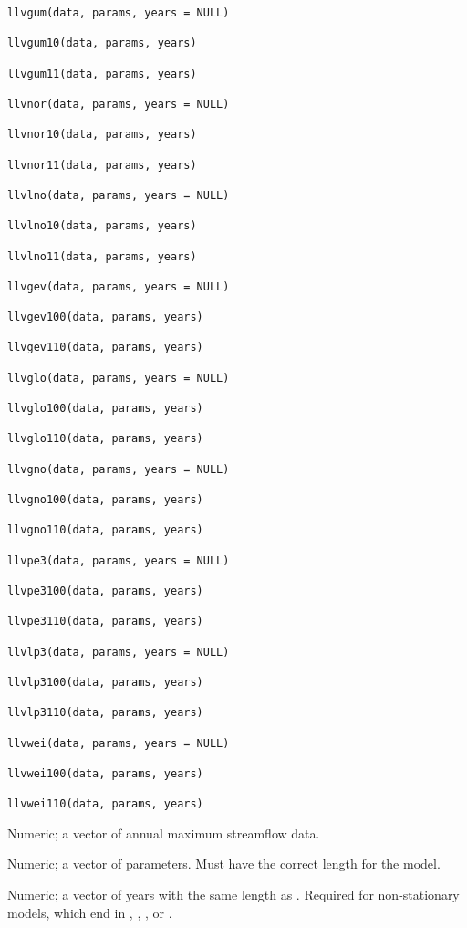 \documentclass[a4paper]{book}
\begin{document}
\begin{Usage}
\begin{verbatim}
llvgum(data, params, years = NULL)

llvgum10(data, params, years)

llvgum11(data, params, years)

llvnor(data, params, years = NULL)

llvnor10(data, params, years)

llvnor11(data, params, years)

llvlno(data, params, years = NULL)

llvlno10(data, params, years)

llvlno11(data, params, years)

llvgev(data, params, years = NULL)

llvgev100(data, params, years)

llvgev110(data, params, years)

llvglo(data, params, years = NULL)

llvglo100(data, params, years)

llvglo110(data, params, years)

llvgno(data, params, years = NULL)

llvgno100(data, params, years)

llvgno110(data, params, years)

llvpe3(data, params, years = NULL)

llvpe3100(data, params, years)

llvpe3110(data, params, years)

llvlp3(data, params, years = NULL)

llvlp3100(data, params, years)

llvlp3110(data, params, years)

llvwei(data, params, years = NULL)

llvwei100(data, params, years)

llvwei110(data, params, years)
\end{verbatim}
\end{Usage}
%
\begin{Arguments}
\begin{ldescription}
\item[\code{data}] Numeric; a vector of annual maximum streamflow data.

\item[\code{params}] Numeric; a vector of parameters. Must have the correct length for the model.

\item[\code{years}] Numeric; a vector of years with the same length as .
Required for non-stationary models, which end in , , , or .
\end{ldescription}
\end{Arguments}
\end{document}
